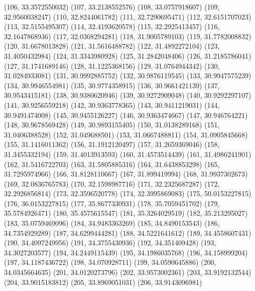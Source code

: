 {					(106, 33.3572550032)
					(107, 33.2138552576)
					(108, 33.0757918607)
					(109, 32.9560038247)
					(110, 32.8244061782)
					(111, 32.7290695471)
					(112, 32.6151707023)
					(113, 32.5155495307)
					(114, 32.4193620578)
					(115, 32.2925413457)
					(116, 32.1647868936)
					(117, 32.0368294281)
					(118, 31.9005789103)
					(119, 31.7782008832)
					(120, 31.6678013828)
					(121, 31.5616488782)
					(122, 31.4892272104)
					(123, 31.4050432984)
					(124, 31.3343980928)
					(125, 31.2842048406)
					(126, 31.2185786041)
					(127, 31.1741689146)
					(128, 31.1225368156)
					(129, 31.0764944342)
					(130, 31.0284933081)
					(131, 30.9992885752)
					(132, 30.9876119545)
					(133, 30.9947575239)
					(134, 30.9946554981)
					(135, 30.9774358915)
					(136, 30.9661421139)
					(137, 30.9543415181)
					(138, 30.9380620946)
					(139, 30.9272909048)
					(140, 30.9292297107)
					(141, 30.9256559218)
					(142, 30.9363778365)
					(143, 30.9411219031)
					(144, 30.9491474008)
					(145, 30.9455126227)
					(146, 30.9363474667)
					(147, 30.946764221)
					(148, 30.9678569428)
					(149, 30.9893155405)
					(150, 31.0138289168)
					(151, 31.0406388528)
					(152, 31.049688501)
					(153, 31.0667488811)
					(154, 31.0905845668)
					(155, 31.1416011362)
					(156, 31.1912120497)
					(157, 31.2659369046)
					(158, 31.3455332194)
					(159, 31.4013913593)
					(160, 31.4573514439)
					(161, 31.4986241901)
					(162, 31.5416722703)
					(163, 31.5805885316)
					(164, 31.6438853298)
					(165, 31.7295974966)
					(166, 31.8128110667)
					(167, 31.899419994)
					(168, 31.9937302673)
					(169, 32.0836765783)
					(170, 32.1598987716)
					(171, 32.2325687287)
					(172, 32.2926856814)
					(173, 32.3596520778)
					(174, 32.3995869083)
					(175, 50.0153227815)
					(176, 36.0153227815)
					(177, 35.8677330931)
					(178, 35.7059451702)
					(179, 35.5784926471)
					(180, 35.4575615547)
					(181, 35.3264029519)
					(182, 35.213295027)
					(183, 35.0759469096)
					(184, 34.9483363269)
					(185, 34.8490153543)
					(186, 34.7354929289)
					(187, 34.6299444281)
					(188, 34.5221641612)
					(189, 34.4558607431)
					(190, 34.4097249956)
					(191, 34.3755430936)
					(192, 34.351409428)
					(193, 34.3027203577)
					(194, 34.2449115439)
					(195, 34.1986035768)
					(196, 34.158999204)
					(197, 34.1187436722)
					(198, 34.070928711)
					(199, 34.0590645886)
					(200, 34.0345664635)
					(201, 34.0120273796)
					(202, 33.9573002361)
					(203, 33.9192132544)
					(204, 33.9015183812)
					(205, 33.8969051031)
					(206, 33.9143096981)
}
